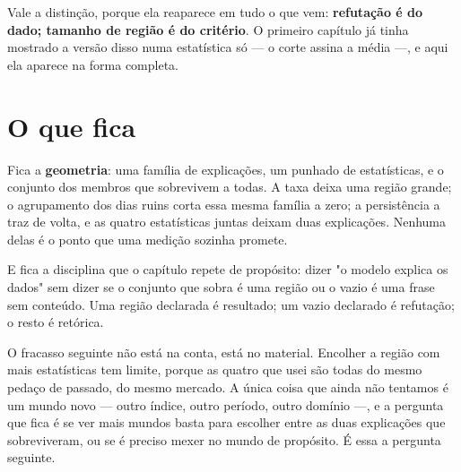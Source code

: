 Vale a distinção, porque ela reaparece em tudo o que vem: \textbf{refutação é do dado; tamanho de
região é do critério}. O primeiro capítulo já tinha mostrado a versão disso numa estatística só
--- o corte assina a média ---, e aqui ela aparece na forma completa.

\section{O que fica}

Fica a \textbf{geometria}: uma família de explicações, um punhado de estatísticas, e o conjunto
dos membros que sobrevivem a todas. A taxa deixa uma região grande; o agrupamento dos dias ruins
corta essa mesma família a zero; a persistência a traz de volta, e as quatro estatísticas juntas
deixam duas explicações. Nenhuma delas é o ponto que uma medição sozinha promete.

E fica a disciplina que o capítulo repete de propósito: dizer "o modelo explica os dados" sem
dizer se o conjunto que sobra é uma região ou o vazio é uma frase sem conteúdo. Uma região
declarada é resultado; um vazio declarado é refutação; o resto é retórica.

O fracasso seguinte não está na conta, está no material. Encolher a região com mais estatísticas
tem limite, porque as quatro que usei são todas do mesmo pedaço de passado, do mesmo mercado. A
única coisa que ainda não tentamos é um mundo novo --- outro índice, outro período, outro
domínio ---, e a pergunta que fica é se ver mais mundos basta para escolher entre as duas
explicações que sobreviveram, ou se é preciso mexer no mundo de propósito. É essa a pergunta seguinte.
